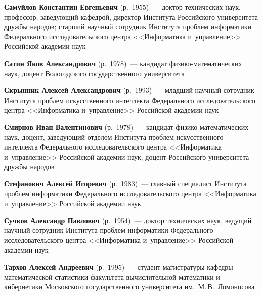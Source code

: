 \begin{multicols}{2}

\columnbreak

\noindent
\textbf{Самуйлов Константин Евгеньевич} (р.\ 1955)~--- 
доктор технических наук, профессор, заведующий ка\-фед\-рой, директор 
Института Российского университета дружбы народов; 
старший научный сотрудник Института проб\-лем информатики Федерального 
исследовательского центра <<Информатика и~управ\-ле\-ние>> Российской академии наук

\vspace*{3pt}

\noindent
\textbf{Сатин Яков Александрович} (р.\ 1978)~--- кандидат
 фи\-зи\-ко-ма\-те\-ма\-ти\-че\-ских наук, доцент Вологодского 
 государственного университета
 
\vspace*{3pt}
 
 \noindent
\textbf{Скрынник Алексей Александрович} (р.\ 1993)~--- 
младший научный сотрудник Института проб\-лем искусственного интеллекта 
Федерального исследовательского центра <<Информатика и~управ\-ле\-ние>>
 Российской академии наук
 
\vspace*{3pt}

 \noindent
\textbf{Смирнов Иван Валентинович} (р.\ 1978)~--- 
кандидат фи\-зи\-ко-ма\-те\-ма\-ти\-че\-ских наук, доцент, за\-ве\-ду\-ющий отделом 
Института проб\-лем искусственного интеллекта Федерального исследовательского центра 
<<Информатика и~управ\-ле\-ние>> Российской академии наук; 
доцент Российского университета дружбы народов

\vspace*{3pt}

\noindent
\textbf{Стефанович Алексей Игоревич} (р.\ 1983)~--- главный специалист Института 
проб\-лем информатики Федерального исследовательского центра <<Информатика и~управ\-ле\-ние>>
Российской академии наук

\vspace*{3pt}

\noindent
\textbf{Сучков Александр Павлович} (р.\ 1954)~--- 
доктор технических наук, ведущий научный сотрудник Инсти\-тута проб\-лем 
информатики Федерального исследовательского центра <<Информатика и~управ\-ле\-ние>>
Российской академии наук 

\vspace*{3pt}

\noindent
\textbf{Тархов Алексей Андреевич} (р.\ 1995)~--- студент магистратуры 
кафедры математической статистики факультета вычислительной 
математики и кибернетики Московского государственного университета 
им.\ М.\,В.~Ломоносова


\end{multicols}
